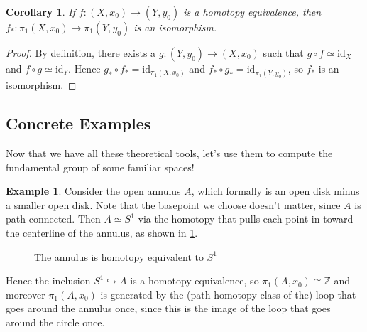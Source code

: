 \documentclass{article}
\newtheorem{cor}[thm]{Corollary}
\theoremstyle{definition}
\newtheorem{exa}[thm]{Example}
\theoremstyle{remark}
\newcommand{\Z}{\mathbb Z}
\numberwithin{figure}{section}
\begin{document}
\begin{cor}\label{cor:homotopy invariance}
	If $f : (X, x_0) \to (Y, y_0)$ is a homotopy equivalence, then $f_* :\pi_1(X, x_0) \to \pi_1(Y, y_0)$ is an isomorphism.
\end{cor}

\begin{proof}
	By definition, there exists a $g : (Y, y_0) \to (X, x_0)$ such that $g \circ f \simeq \mathrm{id}_X$ and $f \circ g \simeq \mathrm{id}_Y$. Hence $g_* \circ f_* = \mathrm{id}_{\pi_1(X, x_0)}$ and $f_* \circ g_* = \mathrm{id}_{\pi_1(Y, y_0)}$, so $f_*$ is an isomorphism.
\end{proof}

\subsection{Concrete Examples}\label{sec:examples}
Now that we have all these theoretical tools, let's use them to compute the fundamental group of some familiar spaces!

\begin{exa}\label{exa:compute annulus}
	Consider the open annulus $A$, which formally is an open disk minus a smaller open disk. Note that the basepoint we choose doesn't matter, since $A$ is path-connected. Then $A \simeq S^1$ via the homotopy that pulls each point in toward the centerline of the annulus, as shown in \cref{fig:annulus}.
	
	\begin{figure}[h]
		\centering
		\caption{The annulus is homotopy equivalent to $S^1$}
		\label{fig:annulus}
	\end{figure}
	
	Hence the inclusion $S^1 \hookrightarrow A$ is a homotopy equivalence, so $\pi_1(A, x_0) \cong \Z$ and moreover $\pi_1(A, x_0)$ is generated by the (path-homotopy class of the) loop that goes around the annulus once, since this is the image of the loop that goes around the circle once.
\end{exa}
\end{document}
